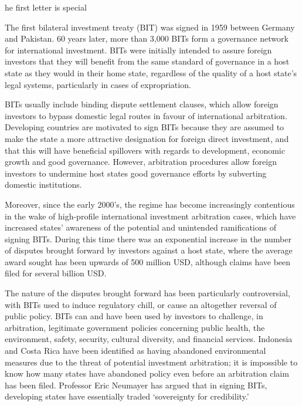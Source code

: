 \label{ch:bilateral-investment-treaties}

he first letter is special



   The first bilateral investment treaty (BIT) was signed in 1959 between
   Germany and Pakistan. 60 years later, more than 3,000 BITs form a
   governance network for international investment. BITs were initially
   intended to assure foreign investors that they will benefit from the
   same standard of governance in a host state as they would in their home
   state, regardless of the quality of a host state's legal systems,
   particularly in cases of expropriation.

   BITs usually include binding dispute settlement clauses, which allow
   foreign investors to bypass domestic legal routes in favour of
   international arbitration. Developing countries are motivated to sign
   BITs because they are assumed to make the state a more attractive
   designation for foreign direct investment, and that this will have
   beneficial spillovers with regards to development, economic growth and
   good governance. However, arbitration procedures allow foreign
   investors to undermine host states good governance efforts by
   subverting domestic institutions.

   Moreover, since the early 2000's, the regime has become increasingly
   contentious in the wake of high-profile international investment
   arbitration cases, which have increased states' awareness of the
   potential and unintended ramifications of signing BITs. During this
   time there was an exponential increase in the number of disputes
   brought forward by investors against a host state, where the average
   award sought has been upwards of 500 million USD, although claims have
   been filed for several billion USD.

   The nature of the disputes brought forward has been particularly
   controversial, with BITs used to induce regulatory chill, or cause an
   altogether reversal of public policy. BITs can and have been used by
   investors to challenge, in arbitration, legitimate government policies
   concerning public health, the environment, safety, security, cultural
   diversity, and financial services. Indonesia and Costa Rica have been
   identified as having abandoned environmental measures due to the threat
   of potential investment arbitration; it is impossible to know how many
   states have abandoned policy even before an arbitration claim has been
   filed. Professor Eric Neumayer has argued that in signing BITs,
   developing states have essentially traded `sovereignty for
   credibility.'

